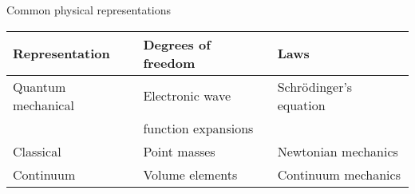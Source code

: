 \begin{frame}[fragile]{Common physical representations}

\begin{center}
    \begin{tabular}{lll}
        Representation & Degrees of freedom & Laws\\\hline
        Quantum mechanical & Electronic wave  & Schr\"odinger's equation\\
          &  function expansions & \\
        Classical & Point masses & Newtonian mechanics\\
        Continuum & Volume elements & Continuum mechanics
    \end{tabular}
\end{center}
\end{frame}
